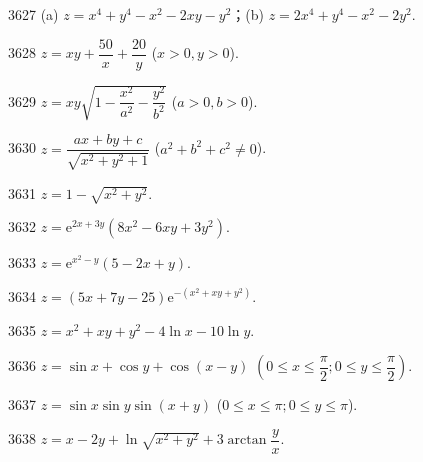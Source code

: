 \begin{prob}[M]{3627}
(a) $z = x^4 + y^4 - x^2 - 2xy - y^2$；\qquad (b) $z = 2x^4 + y^4 - x^2 - 2y^2$.
\end{prob}

\begin{prob}[S]{3628}
$z = xy + \dfrac{50}{x} + \dfrac{20}{y}$ ($x > 0, y > 0$).
\end{prob}

\begin{prob}[S]{3629}
$z = xy\sqrt{1 - \dfrac{x^2}{a^2} - \dfrac{y^2}{b^2}}$ ($a > 0, b > 0$).
\end{prob}

\begin{prob}[S]{3630}
$z = \dfrac{ax + by + c}{\sqrt{x^2 + y^2 + 1}}$ ($a^2 + b^2 + c^2 \neq 0$).
\end{prob}

\begin{prob}[S]{3631}
$z = 1 - \sqrt{x^2 + y^2}$.
\end{prob}

\begin{prob}[S]{3632}
$z = \mathrm{e}^{2x + 3y}(8x^2 - 6xy + 3y^2)$.
\end{prob}

\begin{prob}[S]{3633}
$z = \mathrm{e}^{x^2 - y}(5 - 2x + y)$.
\end{prob}

\begin{prob}[S]{3634}
$z = (5x + 7y - 25)\mathrm{e}^{-(x^2 + xy + y^2)}$.
\end{prob}

\begin{prob}[S]{3635}
$z = x^2 + xy + y^2 - 4\ln x - 10\ln y$.
\end{prob}

\begin{prob}[S]{3636}
$z = \sin x + \cos y + \cos(x - y)$ $\left(0 \leqslant x \leqslant \dfrac{\pi}{2}; 0 \leqslant y \leqslant \dfrac{\pi}{2}\right)$.
\end{prob}

\begin{prob}[S]{3637}
$z = \sin x \sin y \sin(x + y)$ ($0 \leqslant x \leqslant \pi; 0 \leqslant y \leqslant \pi$).
\end{prob}

\begin{prob}[S]{3638}
$z = x - 2y + \ln\sqrt{x^2 + y^2} + 3\arctan\dfrac{y}{x}$.
\end{prob}

